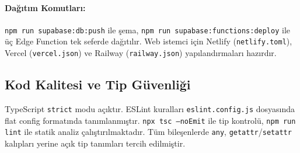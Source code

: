 \paragraph{Dağıtım Komutları:}
\texttt{npm run supabase:db:push} ile şema, \texttt{npm run supabase:functions:deploy} ile üç Edge Function tek seferde dağıtılır. Web istemci için Netlify (\texttt{netlify.toml}), Vercel (\texttt{vercel.json}) ve Railway (\texttt{railway.json}) yapılandırmaları hazırdır.

\subsection{Kod Kalitesi ve Tip Güvenliği}

TypeScript \texttt{strict} modu açıktır. ESLint kuralları \texttt{eslint.config.js} dosyasında flat config formatında tanımlanmıştır. \texttt{npx tsc --noEmit} ile tip kontrolü, \texttt{npm run lint} ile statik analiz çalıştırılmaktadır. Tüm bileşenlerde \texttt{any}, \texttt{getattr}/\texttt{setattr} kalıpları yerine açık tip tanımları tercih edilmiştir.
